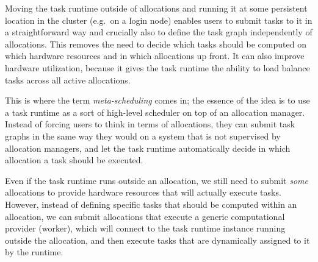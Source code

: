 \begin{description}[wide=0pt]
	\item[Task runtime runs outside of allocations] Moving the task runtime outside of allocations and running it at some persistent location in the
		cluster (e.g.\ on a login node) enables users to submit tasks to it in a straightforward way and
		crucially also to define the task graph independently of allocations. This removes the need to
		decide which tasks should be computed on which hardware resources and in which allocations up
		front. It can also improve hardware utilization, because it gives the task runtime the ability to
		load balance tasks across all active allocations.

		This is where the term \emph{meta-scheduling} comes in; the essence of the idea is to use a task
		runtime as a sort of high-level scheduler on top of an allocation manager. Instead of forcing users
		to think in terms of allocations, they can submit task graphs in the same way they would on a
		system that is not supervised by allocation managers, and let the task runtime automatically decide
		in which allocation a task should be executed.

	\item[Allocations are uniform] Even if the task runtime runs outside an allocation, we still need to submit \emph{some}
		allocations to provide hardware resources that will actually execute tasks. However, instead of
		defining specific tasks that should be computed within an allocation, we can submit allocations
		that execute a generic computational provider (worker), which will connect to the task runtime
		instance running outside the allocation, and then execute tasks that are dynamically assigned to it
		by the runtime.


\end{description}
